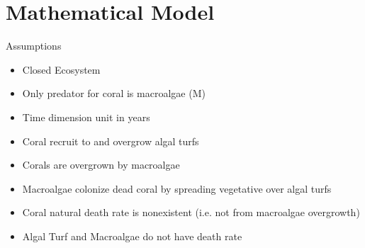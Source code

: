 \documentclass{beamer}
\begin{document}


\section{Mathematical Model} %

\begin{frame}{Assumptions}
    \begin{itemize}
        \item Closed Ecosystem
        \item Only predator for coral is macroalgae (M)
        \item Time dimension unit in years
        \item Coral recruit to and overgrow algal turfs\cite{04_mathanalysis}
        \item Corals are overgrown by macroalgae\cite{04_mathanalysis}
        \item Macroalgae colonize dead coral by spreading vegetative over algal turfs\cite{04_mathanalysis}
        \item Coral natural death rate is nonexistent (i.e. not from macroalgae overgrowth)
        \item Algal Turf and Macroalgae do not have death rate
    \end{itemize}
\end{frame}
\end{document}
